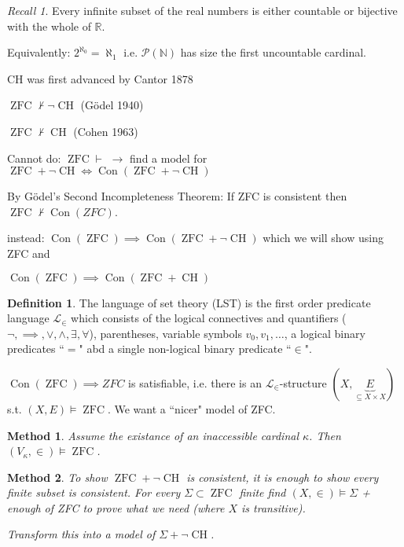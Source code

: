 \documentclass{scrartcl}
\renewcommand{\P}{\mathcal{P}}
\renewcommand{\L}{\mathcal{L}}
\newcommand{\N}{\mathbb{N}}
\newcommand{\R}{\mathbb{R}}
\newcommand{\Le}{\L_\in}
\DeclareMathOperator{\Con}{Con}
\DeclareMathOperator{\ZFC}{ZFC}
\DeclareMathOperator{\CH}{CH}
\theoremstyle{definition}
\newtheorem*{definition*}{Definition}
\theoremstyle{plain}
\newtheorem{method}{Method}
\theoremstyle{remark}
\newtheorem*{recall*}{Recall}
\begin{document}
	\begin{recall*}
		Every infinite subset of the real numbers is either countable or bijective with the whole of $\R$.
		
		Equivalently: $2^{\aleph_0} = \aleph_1$ i.e. $\P(\N)$ has size the first uncountable cardinal.
	\end{recall*}

	CH was first advanced by Cantor 1878
	
	$\ZFC \nvdash \lnot \CH$	(Gödel 1940)	
	
	$\ZFC \nvdash \CH$  (Cohen 1963)
	
	\vspace*{2mm}
	
	Cannot do: $\ZFC \vdash$ \uwave{``$\ZFC \nvdash \CH$"} $\longrightarrow$ find a model for $\ZFC + \lnot \CH \iff \Con(\ZFC + \lnot \CH)$
	
	By Gödel's Second Incompleteness Theorem: If ZFC is consistent then $\ZFC \nvdash \Con(ZFC)$. 
	
	instead: $\Con(\ZFC) \implies \Con(\ZFC + \lnot \CH)$ which we will show using ZFC and  
	
	$\Con(\ZFC)\implies\Con(\ZFC+\CH)$
	
	\begin{definition*}
		The language of set theory (LST) is the first order predicate language $\Le$ which consists of the logical connectives and quantifiers ($\lnot, \implies, \lor, \land, \exists, \forall$), parentheses, variable symbols $v_0, v_1, \dots$, a logical binary predicates ``$=$" abd a single non-logical binary predicate ``$\in$". 
	\end{definition*}

	$\Con(\ZFC) \implies ZFC$ is satisfiable, i.e. there is an $\Le$-structure $(X, \underbrace{E}_{\subseteq X \times X})$ s.t. $(X, E) \vDash \ZFC$. We want a ``nicer" model of ZFC.
	
	\begin{method}
		Assume the existance of an inaccessible cardinal $\kappa$. Then $(V_\kappa, \in) \vDash \ZFC$.
	\end{method}

	\begin{method}
		To show $\ZFC + \lnot \CH$ is consistent, it is enough to show every finite subset is consistent. For every $\Sigma \subset \ZFC$ finite find $(X, \in) \vDash \Sigma$ + enough of ZFC to prove what we need (where $X$ is transitive).
		
		Transform this into a model of $\Sigma + \lnot \CH$.
	\end{method}
\end{document}
